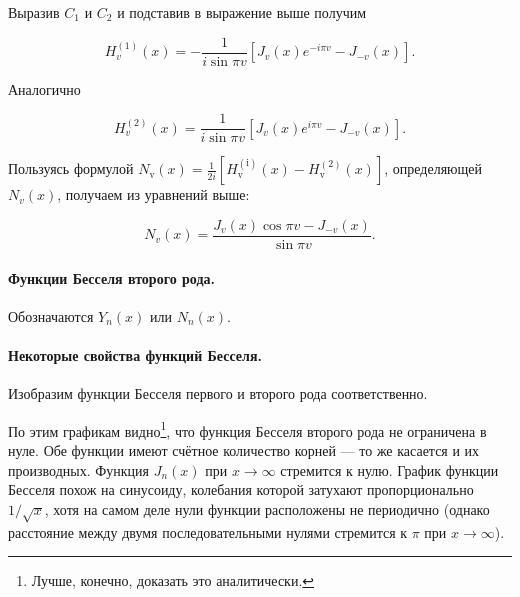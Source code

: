 Выразив $C_1$ и $C_2$ и подставив в выражение выше получим 

\[
H_{v}^{(1)}(x)=-\frac{1}{i \sin \pi v}\left[J_{v}(x) e^{-i \pi v}-J_{-v}(x)\right] .
\]

Аналогично

\[
H_{v}^{(2)}(x)=\frac{1}{i \sin \pi v}\left[J_{v}(x) e^{i \pi v}-J_{-v}(x)\right] .
\]

Пользуясь формулой $N_{\mathrm{v}}(x)=\frac{1}{2 i}\left[H_{\mathrm{v}}^{(\mathrm{i})}(x)-H_{\mathrm{v}}^{(2)}(x)\right]$, определяющей $N_{v}(x)$, получаем из уравнений выше:

\[
N_{v}(x)=\frac{J_{v}(x) \cos \pi v-J_{-v}(x)}{\sin \pi v} .
\]

\paragraph{Функции Бесселя второго рода.}
Обозначаются $ Y_n(x) $ или $ N_n(x) $.

\paragraph{Некоторые свойства функций Бесселя.}
Изобразим функции Бесселя первого и второго рода соответственно.





По этим графикам видно\footnote{Лучше, конечно, доказать это аналитически.}, что
функция Бесселя второго рода не ограничена в нуле. Обе функции имеют счётное
количество корней --- то же касается и их производных. Функция $ J_n(x) $ при $
x\to\infty$ стремится к нулю. График функции Бесселя похож на
синусоиду, колебания которой затухают пропорционально $1/\sqrt{x}$, хотя на самом деле нули функции расположены не периодично (однако расстояние между двумя последовательными нулями стремится к 
$\pi$ при $x\to \infty $).